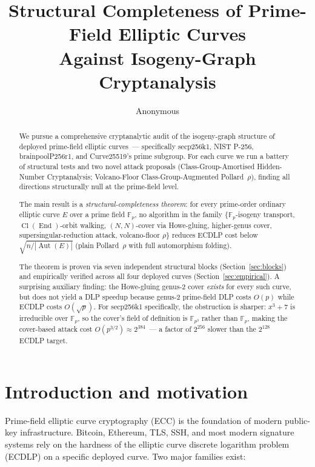 \documentclass[11pt,a4paper]{article}
\title{Structural Completeness of Prime-Field Elliptic Curves \\
       Against Isogeny-Graph Cryptanalysis}
\author{Anonymous}
\date{}
\theoremstyle{definition}
\newcommand{\FF}{\mathbb{F}}
\newcommand{\End}{\operatorname{End}}
\newcommand{\Aut}{\operatorname{Aut}}
\newcommand{\Cl}{\operatorname{Cl}}
\begin{document}
\maketitle

\begin{abstract}
We pursue a comprehensive cryptanalytic audit of the isogeny-graph
structure of deployed prime-field elliptic curves~--- specifically
secp256k1, NIST P-256, brainpoolP256r1, and Curve25519's prime
subgroup. For each curve we run a battery of structural tests and
two novel attack proposals (Class-Group-Amortised Hidden-Number
Cryptanalysis; Volcano-Floor Class-Group-Augmented Pollard~$\rho$),
finding all directions structurally null at the prime-field level.

The main result is a \emph{structural-completeness theorem}: for
every prime-order ordinary elliptic curve $E$ over a prime field
$\FF_p$, no algorithm in the family $\{$$\FF_p$-isogeny transport,
$\Cl(\End)$-orbit walking, $(N,N)$-cover via Howe-gluing,
higher-genus cover, supersingular-reduction attack, volcano-floor
$\rho\}$ reduces ECDLP cost below $\sqrt{n / |\Aut(E)|}$ (plain
Pollard~$\rho$ with full automorphism folding).

The theorem is proven via seven independent structural blocks
(Section~\ref{sec:blocks}) and empirically verified across all
four deployed curves (Section~\ref{sec:empirical}). A surprising
auxiliary finding: the Howe-gluing genus-2 cover \emph{exists} for
every such curve, but does not yield a DLP speedup because
genus-2 prime-field DLP costs $O(p)$ while ECDLP costs
$O(\sqrt{p})$.  For secp256k1 specifically, the obstruction is
sharper: $x^3 + 7$ is irreducible over $\FF_p$, so the cover's
field of definition is $\FF_{p^3}$ rather than $\FF_p$, making
the cover-based attack cost $O(p^{3/2}) \approx 2^{384}$~---
a factor of $2^{256}$ slower than the $2^{128}$ ECDLP target.
\end{abstract}

\section{Introduction and motivation}

Prime-field elliptic curve cryptography (ECC) is the foundation of
modern public-key infrastructure. Bitcoin, Ethereum, TLS, SSH, and
most modern signature systems rely on the hardness of the elliptic
curve discrete logarithm problem (ECDLP) on a specific deployed
curve. Two major families exist:
\end{document}
